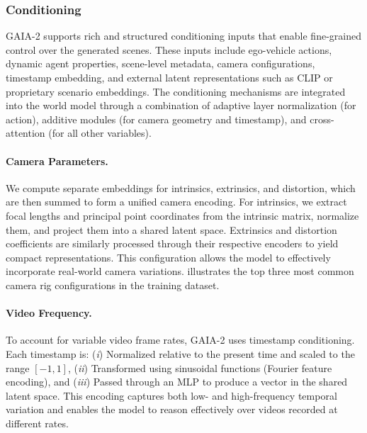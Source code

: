 \subsubsection{Conditioning}
\label{subsubsection:conditioning}
GAIA-2 supports rich and structured conditioning inputs that enable fine-grained control over the generated scenes. These inputs include ego-vehicle actions, dynamic agent properties, scene-level metadata, camera configurations, timestamp embedding, and external latent representations such as CLIP or proprietary scenario embeddings. The conditioning mechanisms are integrated into the world model through a combination of adaptive layer normalization (for action), additive modules (for camera geometry and timestamp), and cross-attention (for all other variables).

\paragraph{Camera Parameters.} We compute separate embeddings for intrinsics, extrinsics, and distortion, which are then summed to form a unified camera encoding. For intrinsics, we extract focal lengths and principal point coordinates from the intrinsic matrix, normalize them, and project them into a shared latent space. Extrinsics and distortion coefficients are similarly processed through their respective encoders to yield compact representations. This configuration allows the model to effectively incorporate real-world camera variations.  illustrates the top three most common camera rig configurations in the training dataset.


\paragraph{Video Frequency.} To account for variable video frame rates, GAIA-2 uses timestamp conditioning. Each timestamp is: (\textit{i}) Normalized relative to the present time and scaled to the range $[-1, 1]$, (\textit{ii}) Transformed using sinusoidal functions (Fourier feature encoding), and (\textit{iii}) Passed through an MLP to produce a vector in the shared latent space. This encoding captures both low- and high-frequency temporal variation and enables the model to reason effectively over videos recorded at different rates.

